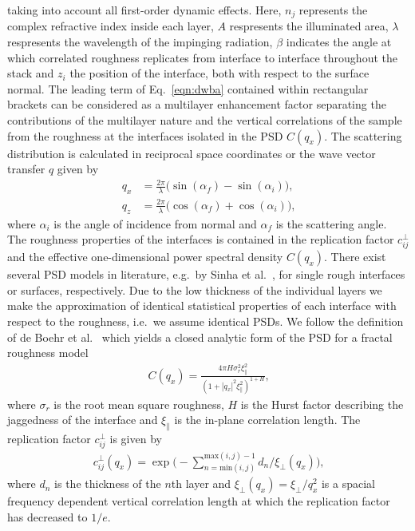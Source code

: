 taking into account all first-order dynamic effects. Here, $n_j$ represents the complex refractive index inside each layer, $A$ respresents the illuminated area, $\lambda$ respresents the wavelength of the impinging radiation, $\beta$ indicates the angle at which correlated roughness replicates from interface to interface throughout the stack and $z_i$ the position of the interface, both with respect to the surface normal. The leading term of Eq.~\eqref{eqn:dwba} contained within rectangular brackets can be considered as a multilayer enhancement factor separating the contributions of the multilayer nature and the vertical correlations of the sample from the roughness at the interfaces isolated in the PSD $C(q_x)$. The scattering distribution is calculated in reciprocal space coordinates or the wave vector transfer $q$ given by
\begin{align}
        q_x &= \frac{2 \pi}{\lambda} \big(\sin(\alpha_f) - \sin(\alpha_i)\big) \text{,}\\
        q_z &= \frac{2\pi}{\lambda} \big(\cos(\alpha_f) + \cos(\alpha_i)\big) \text{,} 
\end{align}
where $\alpha_i$ is the angle of incidence from normal and $\alpha_f$ is the scattering angle.
The roughness properties of the interfaces is contained in the replication factor $c_{ij}^\perp$ \cite{spiller1993multilayer} and the effective one-dimensional power spectral density $C(q_x)$. There exist several PSD models in literature, e.g.~by Sinha et al.~\cite{PhysRevB.38.2297}, for single rough interfaces or surfaces, respectively. Due to the low thickness of the individual layers we make the approximation of identical statistical properties of each interface with respect to the roughness, i.e.~we assume identical PSDs. We follow the definition of de Boehr et al.~\cite{deBoerLateralCorrelation,PhysRevB.51.5297} which yields a closed analytic form of the PSD for a fractal roughness model
\begin{align}
    C(q_x) = \frac{4 \pi H \sigma_r^2 \xi_\parallel^2}{(1+|q_x|^2\xi_\parallel^2)^{1+H}} \text{,} \label{eqn:psd} 
\end{align}
where $\sigma_r$ is the root mean square roughness, $H$ is the Hurst factor describing the jaggedness of the interface and $\xi_\parallel$ is the in-plane correlation length. The replication factor $c_{ij}^\perp$ is given by
\begin{align}
c_{ij}^\perp(q_x) =  \exp\Bigg(-\sum \limits_{n = \text{min}(i,j)}^{\text{max}(i,j)-1}d_n/\xi_\perp(q_x) \Bigg)\text{,}
\end{align}
where $d_n$ is the thickness of the $n$th layer and $\xi_\perp(q_x) = \xi_\perp/q_x^2$ is a spacial frequency dependent vertical correlation length at which the replication factor has decreased to $1/e$.


